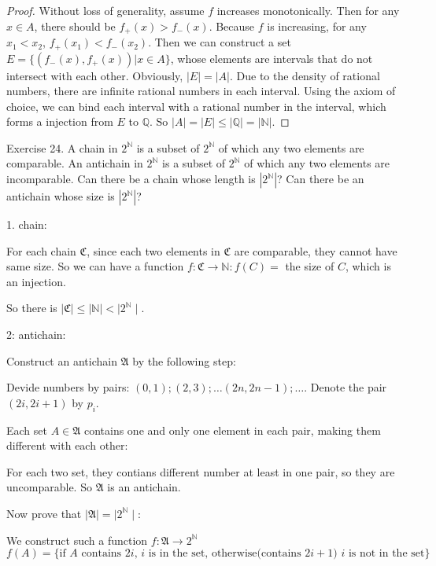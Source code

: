 \documentclass[UTF8, a4paper, linespread=1.5]{article}
\begin{document}
\begin{proof}
	Without loss of generality, assume $f$ increases monotonically. Then for any $x \in A$, there should be $ f_+(x) > f_-(x)$. Because $f$ is increasing, for any $x_1 < x_2$, $ f_+(x_1) < f_-(x_2)$. Then we can construct a set $E=\{(f_-(x),f_+(x)) | x\in A\}$, whose elements are intervals that do not intersect with each other. Obviously, $|E|=|A|$. Due to the density of rational numbers, there are infinite rational numbers in each interval. Using the axiom of choice, we can bind each interval with a rational number in the interval, which forms a injection from $E$ to $\mathbb{Q}$. So $|A|=|E|\le|\mathbb{Q}|=|\mathbb{N}|$.
\end{proof}

\begin{thm}{Exercise 24.}{}
   A chain in $2^\mathbb{N} $ is a subset of $2^\mathbb{N} $ of which any two elements are comparable. An antichain in $2^\mathbb{N} $ is a subset of $2^\mathbb{N} $ of which any two elements are incomparable. Can there be a chain whose length is $|2^\mathbb{N} |$? Can there be an antichain whose size is $|2^\mathbb{N} |$? 
\end{thm}
1. chain:

For each chain $\mathfrak C$, since each two elements in $\mathfrak C$ are comparable, they cannot have same size.
So we can have a function $f:\mathfrak C\rightarrow\mathbb N:f(C)=$ the size of $C$, which is an injection.

So there is $\mid\mathfrak C\mid\leq\mid\mathbb N\mid<\mid 2^{\mathbb N}\mid$.

2: antichain:

Construct an antichain $\mathfrak A$ by the following step:

Devide numbers by pairs: $(0, 1);(2, 3);\dots (2n, 2n - 1);\dots$. Denote the pair $(2i, 2i + 1)$ by $p_i$.

Each set $A\in\mathfrak A$ contains one and only one element in each pair, making them different with each other:

For each two set, they contians different number at least in one pair, so they are uncomparable.
So $\mathfrak A$ is an antichain.

Now prove that $\mid\mathfrak A\mid=\mid2^{\mathbb N}\mid$:

We construct such a function $f:\mathfrak A\rightarrow 2^{\mathbb N}$
$$f(A)=\{\text{if $A$ contains $2i$, $i$ is in the set, otherwise(contains $2i+1$) $i$ is not in the set}\}$$
\end{document}
